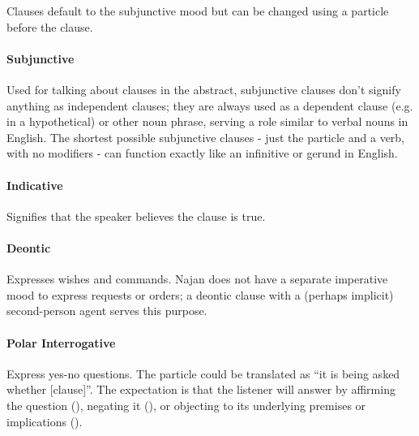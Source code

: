 Clauses default to the subjunctive mood but can be changed using a particle
before the clause.

\paragraph{Subjunctive} Used for talking about clauses in the abstract,
subjunctive clauses don't signify anything as independent clauses; they are
always used as a dependent clause (e.g. in a hypothetical) or other noun phrase,
serving a role similar to verbal nouns in English. The shortest possible
subjunctive clauses - just the particle and a verb, with no modifiers - can
function exactly like an infinitive or gerund in English.

\paragraph{Indicative} Signifies that the speaker believes the clause is true.

\paragraph{Deontic} Expresses wishes and commands. Najan does not have a
separate imperative mood to express requests or orders; a deontic clause with a
(perhaps implicit) second-person agent serves this purpose.

\paragraph{Polar Interrogative} Express yes-no questions. The particle
 could be translated as ``it is being asked whether [clause]''. The
expectation is that the listener will answer by affirming the question
(), negating it (), or objecting to its underlying
premises or implications ().



